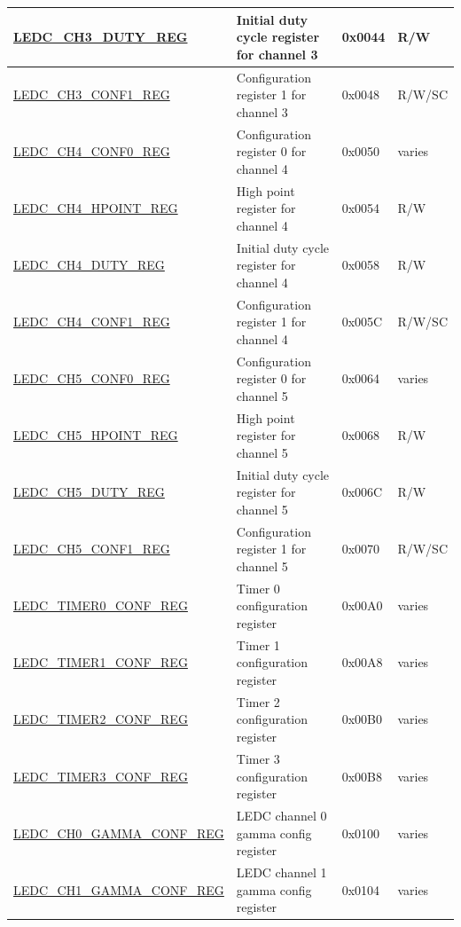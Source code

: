 \begin{longtable}{ | p{5.5cm} | p{6.8cm} | p{1.3cm} | p{2cm}| }
    \hyperref[regdesc:LEDCCHNDUTYREG]{LEDC\_CH3\_DUTY\_REG} & Initial duty cycle register for channel 3 & 0x0044 & R/W \\ \hline
    \hyperref[regdesc:LEDCCHNCONF1REG]{LEDC\_CH3\_CONF1\_REG} & Configuration register 1 for channel 3 & 0x0048 & R/W/SC \\ \hline
    \hyperref[regdesc:LEDCCHNCONF0REG]{LEDC\_CH4\_CONF0\_REG} & Configuration register 0 for channel 4 & 0x0050 & varies \\ \hline
    \hyperref[regdesc:LEDCCHNHPOINTREG]{LEDC\_CH4\_HPOINT\_REG} & High point register for channel 4 & 0x0054 & R/W \\ \hline
    \hyperref[regdesc:LEDCCHNDUTYREG]{LEDC\_CH4\_DUTY\_REG} & Initial duty cycle register for channel 4 & 0x0058 & R/W \\ \hline
    \hyperref[regdesc:LEDCCHNCONF1REG]{LEDC\_CH4\_CONF1\_REG} & Configuration register 1 for channel 4 & 0x005C & R/W/SC \\ \hline
    \hyperref[regdesc:LEDCCHNCONF0REG]{LEDC\_CH5\_CONF0\_REG} & Configuration register 0 for channel 5 & 0x0064 & varies \\ \hline
    \hyperref[regdesc:LEDCCHNHPOINTREG]{LEDC\_CH5\_HPOINT\_REG} & High point register for channel 5 & 0x0068 & R/W \\ \hline
    \hyperref[regdesc:LEDCCHNDUTYREG]{LEDC\_CH5\_DUTY\_REG} & Initial duty cycle register for channel 5 & 0x006C & R/W \\ \hline
    \hyperref[regdesc:LEDCCHNCONF1REG]{LEDC\_CH5\_CONF1\_REG} & Configuration register 1 for channel 5 & 0x0070 & R/W/SC \\ \hline
    \hyperref[regdesc:LEDCTIMERNCONFREG]{LEDC\_TIMER0\_CONF\_REG} & Timer 0 configuration register & 0x00A0 & varies \\ \hline
    \hyperref[regdesc:LEDCTIMERNCONFREG]{LEDC\_TIMER1\_CONF\_REG} & Timer 1 configuration register & 0x00A8 & varies \\ \hline
    \hyperref[regdesc:LEDCTIMERNCONFREG]{LEDC\_TIMER2\_CONF\_REG} & Timer 2 configuration register & 0x00B0 & varies \\ \hline
    \hyperref[regdesc:LEDCTIMERNCONFREG]{LEDC\_TIMER3\_CONF\_REG} & Timer 3 configuration register & 0x00B8 & varies \\ \hline
    \hyperref[regdesc:LEDCCHNGAMMACONFREG]{LEDC\_CH0\_GAMMA\_CONF\_REG} & LEDC channel 0 gamma config register & 0x0100 & varies \\ \hline
    \hyperref[regdesc:LEDCCHNGAMMACONFREG]{LEDC\_CH1\_GAMMA\_CONF\_REG} & LEDC channel 1 gamma config register & 0x0104 & varies \\ \hline

\end{longtable}
